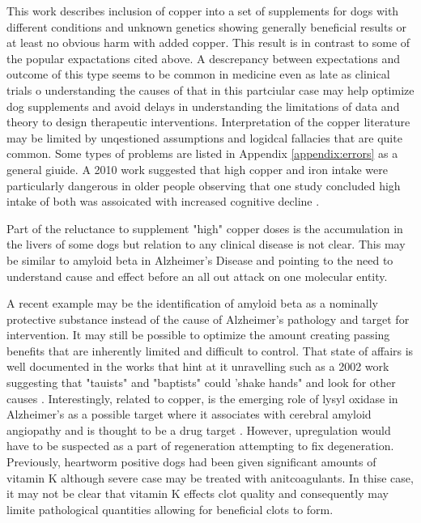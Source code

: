 \documentclass[aps,secnumarabic,balancelastpage,amsmath,amssymb,nofootinbib]{revtex4}
\newcommand{\mjmrefapp}[1]{Appendix  \ref{appendix:#1}}
\begin{document}

This work describes inclusion of copper into a set
of supplements for dogs with different conditions and unknown genetics 
showing generally beneficial results  or at least
no obvious harm with added copper.
This result is in contrast to some of the popular expactations
cited above.
A descrepancy between expectations and outcome 
of this type seems to be common in medicine
even as late as clinical trials 
o understanding the causes of that
in this partciular case may help optimize
dog supplements and avoid delays in understanding the
limitations of data and theory  to design 
therapeutic interventions.  
Interpretation of the copper literature may be  limited by 
unqestioned assumptions and logidcal fallacies 
that are quite common.  Some types of problems
are listed in  \mjmrefapp{errors} as a general giuide. 
A 2010 work suggested that high copper and iron intake were
particularly dangerous in older people observing that
one study concluded high intake of both was assoicated with increased cognitive
decline 
\cite{Brewer_Risks_Copper_2010}.



Part of the reluctance to supplement "high" copper doses
is the accumulation in the livers of some dogs but
relation to any clinical disease is not clear. This
may be similar to amyloid beta in Alzheimer's
Disease and pointing to the need to understand cause
and effect before an all out attack on one molecular
entity.  

A recent example may be the identification of amyloid
beta as a nominally protective substance
\cite{Yu_Wu_Amyloid_upbeta_double_2021}
\cite{PMID35673950}
 instead of
the cause of Alzheimer's pathology and target
for intervention. 
It may still be possible to optimize the amount creating
passing benefits that are inherently limited and difficult
to control. 
That state of affairs is well documented
in the works
that hint at it unravelling\cite{PMID37833948}  such as a 2002 work
suggesting that  "tauists" and "baptists" could 'shake hands"
and look for other causes \cite{PMID11801334}.
Interestingly, related to copper,
is the emerging role of lysyl oxidase in Alzheimer's
as a possible target 
where it associates with cerebral amyloid angiopathy and
is thought to be a drug target 
\cite{Kelly_Sharp_Thomas_Targeting_lysyl_oxidase_2023}
\cite{PMC11042178}. However,  upregulation would have to be
suspected as a part of regeneration attempting to fix
degeneration. 
Previously, heartworm positive dogs had been given
significant amounts of vitamin K
\cite{mmarchywka-MJM-2021-003-v0.50rg}
\cite{mmarchywka-MJM-2019-001-.1li}
 although severe
case may be treated with anitcoagulants. In thise
case, it may not be clear that vitamin K effects clot
quality and consequently may limite pathological quantities
allowing for beneficial clots to form. 
\end{document}
